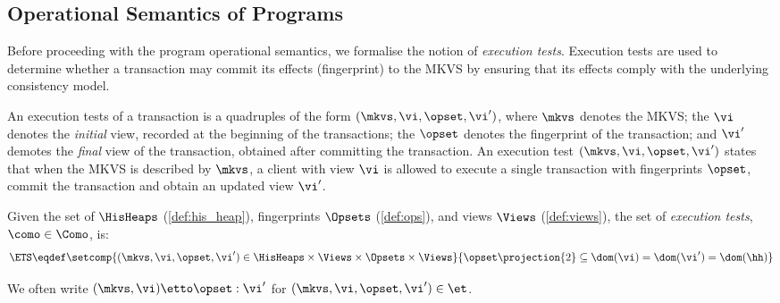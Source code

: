 \subsection{Operational Semantics of Programs}
\label{sec:prog-semantics}

Before proceeding with the program operational semantics, we formalise the notion of \emph{execution tests}.
Execution tests are used to determine whether a transaction may commit its effects (fingerprint) to the MKVS by ensuring that its  effects comply with the underlying consistency model.

An execution tests of a transaction is a quadruples of the form \( (\mkvs, \vi, \opset, \vi') \), where $\mkvs$ denotes the MKVS;
the $\vi$ denotes the \emph{initial} view, recorded at the beginning of the transactions; 
the $\opset$ denotes the fingerprint of the transaction; and 
$\vi'$ demotes the \emph{final} view of the transaction, obtained after committing the transaction. 
An execution test $(\mkvs, \vi, \opset, \vi')$ states that when the MKVS is described by $\mkvs$, a client with view $\vi$ is allowed to execute a single transaction with fingerprints $\opset$, commit the transaction and obtain an updated view $\vi'$. 
%
%
%
%
\begin{definition}
\label{def:consistency-models}
\label{def:executiontests}
Given the set of $\HisHeaps$ (\cref{def:his_heap}), fingerprints $\Opsets$ (\cref{def:ops}), and views $\Views$ (\cref{def:views}), the set of \emph{execution tests}, \( \como \in \Como \), is:
\[
        \ETS \eqdef  
		\setcomp{
			(\mkvs, \vi, \opset, \vi') \in \HisHeaps \times \Views \times \Opsets \times \Views
		} 
		{
		\opset\projection{2} \subseteq \dom(\vi) = \dom(\vi') = \dom(\hh)
		}       
\]
\end{definition}
%
We often write $(\mkvs, \vi) \etto \opset : \vi'$ for  $(\mkvs, \vi, \opset, \vi') \in \et$.


